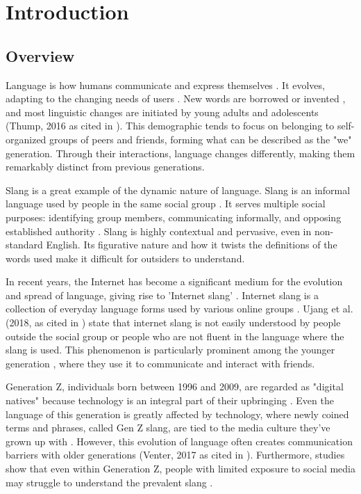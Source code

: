 \chapter{Introduction}
\label{sec:researchdesc}    %

\section{Overview}
\label{sec:overview}

Language is how humans communicate and express themselves \cite{Crystal_Robins_2024}. It evolves, adapting to the changing needs of users \cite{Jeresano_Carretero_2022}. New words are borrowed or invented \cite{article}, and most linguistic changes are initiated by young adults and adolescents (Thump, 2016 as cited in \cite{Jeresano_Carretero_2022}). This demographic tends to focus on belonging to self-organized groups of peers and friends, forming what can be described as the "we" generation. Through their interactions, language changes differently, making them remarkably distinct from previous generations.

Slang is a great example of the dynamic nature of language. Slang is an informal language used by people in the same social group \cite{Fernández-Toro_2016}. It serves multiple social purposes: identifying group members, communicating informally, and opposing established authority \cite{McArthur_1998}. Slang is highly contextual and pervasive, even in non-standard English. Its figurative nature and how it twists the definitions of the words used make it difficult for outsiders to understand. 

In recent years, the Internet has become a significant medium for the evolution and spread of language, giving rise to 'Internet slang' \cite{Liu_Zhang_Li_2023}. Internet slang is a collection of everyday language forms used by various online groups \cite{Barseghyan2014ONSA}. Ujang et al. (2018, as cited in \cite{Sabri2020}) state that internet slang is not easily understood by people outside the social group or people who are not fluent in the language where the slang is used. This phenomenon is particularly prominent among the younger generation \cite{Maulidiya_Wijaya_Mauren_Adha_Pandin_2021}, where they use it to communicate and interact with friends.

Generation Z, individuals born between 1996 and 2009, are regarded as "digital natives" because technology is an integral part of their upbringing \cite{Dua_Jacobson_Ellingrud_Enomoto_Cordina_Coe_Finneman_2024}. Even the language of this generation is greatly affected by technology, where newly coined terms and phrases, called Gen Z slang, are tied to the media culture they've grown up with \cite{Jeresano_Carretero_2022}. However, this evolution of language often creates communication barriers with older generations (Venter, 2017 as cited in \cite{Ghazali_Abdullah_2021}). Furthermore, studies show that even within Generation Z, people with limited exposure to social media may struggle to understand the prevalent slang \cite{Vacalares_Salas_Babac_Cagalawan_Calimpong_2023}. 

